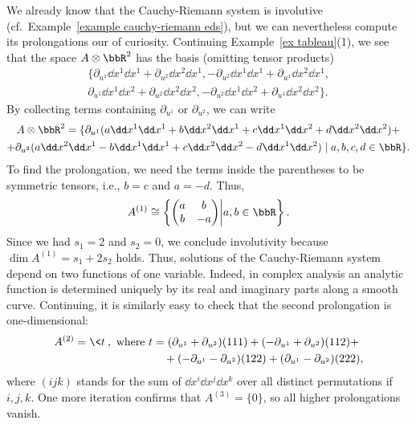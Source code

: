 \begin{example}
    We already know that the Cauchy-Riemann system is involutive (cf.\ Example~\ref{example cauchy-riemann eds}), but we can nevertheless compute its prolongations our of curiosity. Continuing Example~\ref{ex tableau}(1), we see that the space $A\otimes \bbR^2$ has the basis (omitting tensor products)
    \begin{multline}
        \{\partial_{u^1}\dd x^1\dd x^1+\partial_{u^2}\dd x^2\dd x^1,-\partial_{u^2}\dd x^1\dd x^1+\partial_{u^1}\dd x^2\dd x^1,\\
        \partial_{u^1}\dd x^1\dd x^2+\partial_{u^2}\dd x^2\dd x^2, -\partial_{u^2}\dd x^1\dd x^2+\partial_{u^1}\dd x^2\dd x^2\}.
    \end{multline}
    By collecting terms containing $\partial_{u^1}$ or $\partial_{u^2}$, we can write 
    \begin{multline}
        A\otimes\bbR^2=\{\partial_{u^1}(a\dd x^1\dd x^1+b \dd x^2\dd x^1+c\dd x^1\dd x^2+d\dd x^2\dd x^2)+\\
        +\partial_{u^2}(a\dd x^2\dd x^1-b \dd x^1\dd x^1+c\dd x^2\dd x^2-d\dd x^1\dd x^2)\mid a,b,c,d\in\bbR\}.
    \end{multline}
    To find the prolongation, we need the terms inside the parentheses to be symmetric tensors, i.e., $b=c$ and $a=-d$. Thus,
    \[A^{(1)}\cong \left\{
        \begin{pmatrix}
            a&b\\b&-a
        \end{pmatrix}\middle| a,b\in\bbR
    \right\}.\]
    Since we had $s_1=2$ and $s_2=0$, we conclude involutivity because $\dim A^{(1)}=s_1+2s_2$ holds. Thus, solutions of the Cauchy-Riemann system depend on two functions of one variable. Indeed, in complex analysis an analytic function is determined uniquely by its real and imaginary parts along a smooth curve. Continuing, it is similarly easy to check that the second prolongation is one-dimensional:
    \begin{align}
        A^{(2)}=\<t\>,\text{ where }
        t&=(\partial_{u^1}+\partial_{u^2})(111)+(-\partial_{u^1}+\partial_{u^2})(112)+\\
        &\quad +(-\partial_{u^1}-\partial_{u^2})(122)+(\partial_{u^1}-\partial_{u^2})(222),
    \end{align}
    where $(ijk)$ stands for the sum of $\dd x^i\dd x^j\dd x^k$ over all distinct permutations if $i,j,k$. One more iteration confirms that $A^{(3)}=\{0\}$, so all higher prolongations vanish.
\end{example}






